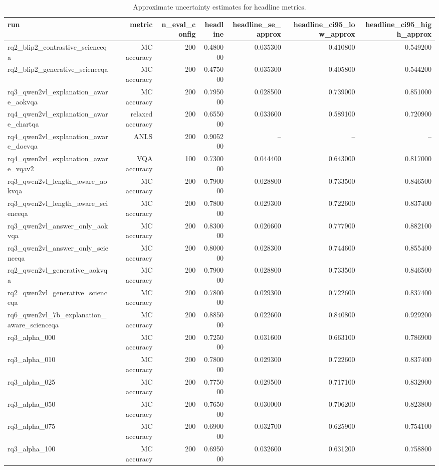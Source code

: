 \begin{table}
\caption{Approximate uncertainty estimates for headline metrics.}
\label{tab:uncertainty}
\begin{tabular}{lrrrrrr}
\toprule
run & metric & n_eval_config & headline & headline_se_approx & headline_ci95_low_approx & headline_ci95_high_approx \\
\midrule
rq2_blip2_contrastive_scienceqa & MC accuracy & 200 & 0.480000 & 0.035300 & 0.410800 & 0.549200 \\
rq2_blip2_generative_scienceqa & MC accuracy & 200 & 0.475000 & 0.035300 & 0.405800 & 0.544200 \\
rq3_qwen2vl_explanation_aware_aokvqa & MC accuracy & 200 & 0.795000 & 0.028500 & 0.739000 & 0.851000 \\
rq4_qwen2vl_explanation_aware_chartqa & relaxed accuracy & 200 & 0.655000 & 0.033600 & 0.589100 & 0.720900 \\
rq4_qwen2vl_explanation_aware_docvqa & ANLS & 200 & 0.905200 & -- & -- & -- \\
rq4_qwen2vl_explanation_aware_vqav2 & VQA accuracy & 100 & 0.730000 & 0.044400 & 0.643000 & 0.817000 \\
rq3_qwen2vl_length_aware_aokvqa & MC accuracy & 200 & 0.790000 & 0.028800 & 0.733500 & 0.846500 \\
rq3_qwen2vl_length_aware_scienceqa & MC accuracy & 200 & 0.780000 & 0.029300 & 0.722600 & 0.837400 \\
rq3_qwen2vl_answer_only_aokvqa & MC accuracy & 200 & 0.830000 & 0.026600 & 0.777900 & 0.882100 \\
rq3_qwen2vl_answer_only_scienceqa & MC accuracy & 200 & 0.800000 & 0.028300 & 0.744600 & 0.855400 \\
rq2_qwen2vl_generative_aokvqa & MC accuracy & 200 & 0.790000 & 0.028800 & 0.733500 & 0.846500 \\
rq2_qwen2vl_generative_scienceqa & MC accuracy & 200 & 0.780000 & 0.029300 & 0.722600 & 0.837400 \\
rq6_qwen2vl_7b_explanation_aware_scienceqa & MC accuracy & 200 & 0.885000 & 0.022600 & 0.840800 & 0.929200 \\
rq3_alpha_000 & MC accuracy & 200 & 0.725000 & 0.031600 & 0.663100 & 0.786900 \\
rq3_alpha_010 & MC accuracy & 200 & 0.780000 & 0.029300 & 0.722600 & 0.837400 \\
rq3_alpha_025 & MC accuracy & 200 & 0.775000 & 0.029500 & 0.717100 & 0.832900 \\
rq3_alpha_050 & MC accuracy & 200 & 0.765000 & 0.030000 & 0.706200 & 0.823800 \\
rq3_alpha_075 & MC accuracy & 200 & 0.690000 & 0.032700 & 0.625900 & 0.754100 \\
rq3_alpha_100 & MC accuracy & 200 & 0.695000 & 0.032600 & 0.631200 & 0.758800 \\
\bottomrule
\end{tabular}
\end{table}
